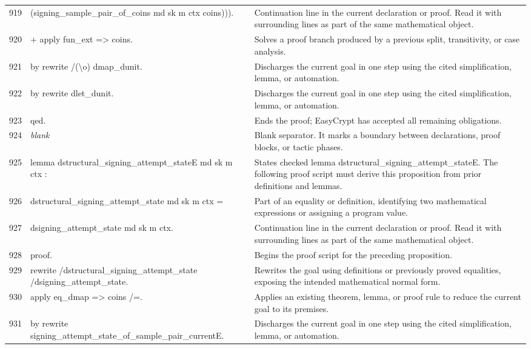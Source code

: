 \documentclass[10pt]{article}
\begin{document}
\begin{longtable}{r L{0.53\textwidth} L{0.37\textwidth}}
919 & {\ttfamily\scriptsize           (signing\_sample\_pair\_of\_coins md sk m ctx coins))).} & Continuation line in the current declaration or proof.  Read it with surrounding lines as part of the same mathematical object. \\
920 & {\ttfamily\scriptsize + apply fun\_ext => coins.} & Solves a proof branch produced by a previous split, transitivity, or case analysis. \\
921 & {\ttfamily\scriptsize   by rewrite /(\textbackslash{}o) dmap\_dunit.} & Discharges the current goal in one step using the cited simplification, lemma, or automation. \\
922 & {\ttfamily\scriptsize by rewrite dlet\_dunit.} & Discharges the current goal in one step using the cited simplification, lemma, or automation. \\
923 & {\ttfamily\scriptsize qed.} & Ends the proof; EasyCrypt has accepted all remaining obligations. \\
924 & {\ttfamily\scriptsize \emph{blank}} & Blank separator.  It marks a boundary between declarations, proof blocks, or tactic phases. \\
925 & {\ttfamily\scriptsize lemma dstructural\_signing\_attempt\_stateE md sk m ctx :} & States checked lemma dstructural\_signing\_attempt\_stateE.  The following proof script must derive this proposition from prior definitions and lemmas. \\
926 & {\ttfamily\scriptsize   dstructural\_signing\_attempt\_state md sk m ctx =} & Part of an equality or definition, identifying two mathematical expressions or assigning a program value. \\
927 & {\ttfamily\scriptsize   dsigning\_attempt\_state md sk m ctx.} & Continuation line in the current declaration or proof.  Read it with surrounding lines as part of the same mathematical object. \\
928 & {\ttfamily\scriptsize proof.} & Begins the proof script for the preceding proposition. \\
929 & {\ttfamily\scriptsize rewrite /dstructural\_signing\_attempt\_state /dsigning\_attempt\_state.} & Rewrites the goal using definitions or previously proved equalities, exposing the intended mathematical normal form. \\
930 & {\ttfamily\scriptsize apply eq\_dmap => coins /=.} & Applies an existing theorem, lemma, or proof rule to reduce the current goal to its premises. \\
931 & {\ttfamily\scriptsize by rewrite signing\_attempt\_state\_of\_sample\_pair\_currentE.} & Discharges the current goal in one step using the cited simplification, lemma, or automation. \\

\end{longtable}
\end{document}

